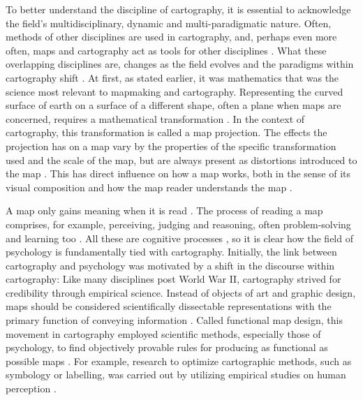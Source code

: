 To better understand the discipline of cartography,
it is essential to acknowledge
the field's multidisciplinary, dynamic and multi-paradigmatic nature.
Often, methods of other disciplines are used in cartography,
and, perhaps even more often,
maps and cartography act as tools for other disciplines \parencite{kai2020}.
What these overlapping disciplines are, changes as the field evolves
and the paradigms within cartography shift
\parencite{kai2020, mac2004}.
At first, as stated earlier,
it was mathematics that was the science most relevant to mapmaking and cartography.
Representing the curved surface of earth  %
on a surface of a different shape, often a plane when maps are concerned,
requires a mathematical transformation \parencite{tyn1992}.
In the context of cartography, this transformation is called a map projection.
The effects the projection has on a map vary by
the properties of the specific transformation used and the scale of the map,
but are always present as distortions introduced to the map \parencite{tyn1992}.
This has direct influence on how a map works, both in the sense of
its visual composition and
how the map reader understands the map \parencite{ker2018}.


A map only gains meaning when it is read \parencite{gri2017}.
The process of reading a map comprises, for example,
perceiving, judging and reasoning,
often problem-solving and learning too \parencite{mon2002}.
All these are cognitive processes \parencite{apacog},
so it is clear how the field of psychology is fundamentally tied with cartography.
Initially, the link between cartography and psychology
was motivated by a shift in the discourse within cartography:
Like many disciplines post World War II,
cartography strived for credibility through empirical science.
Instead of objects of art and graphic design,
maps should be considered scientifically dissectable representations
with the primary function of conveying information \parencite{rob1952}.
Called functional map design,
this movement in cartography employed scientific methods,
especially those of psychology,
to find objectively provable rules
for producing as functional as possible maps \parencite{mon2002}.
For example,
research to optimize cartographic methods, such as symbology or labelling,
was carried out by utilizing empirical studies on human perception \parencite{mac2004}.

